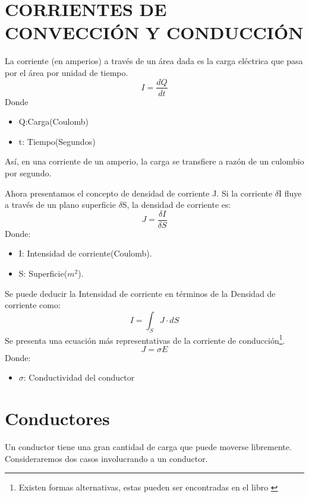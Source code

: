 \documentclass[
	12pt, %
	fleqn, %
	a4paper, %
]{LegrandOrangeBook}
\begin{document}
\section{CORRIENTES DE CONVECCIÓN Y CONDUCCIÓN}
\begin{definition}[Corriente]
La corriente (en amperios) a través de un área dada es la carga eléctrica que pasa por el área por unidad de tiempo.\\
\begin{equation}
\label{eq:corriente}
I=\frac{dQ}{dt}
\end{equation}
Donde\\
\begin{itemize}
\item Q:Carga(Coulomb)
\item t: Tiempo(Segundos)
\end{itemize}
Así, en una corriente de un amperio, la carga se transfiere a razón de un culombio por segundo.
\end{definition}
\begin{definition}
Ahora presentamos el concepto de densidad de corriente J. Si la corriente $\delta$I fluye a través de un plano superficie $\delta$S, la densidad de corriente es:
\begin{equation}
\label{eq: densidad de corriente}
J=\frac{\delta I}{\delta S}
\end{equation}
Donde:
\begin{itemize}
\item I: Intensidad de corriente(Coulomb).
\item S: Superficie($m^2$).
\end{itemize}
\end{definition}
Se puede deducir la Intensidad de corriente en términos de la Densidad de corriente como:
\begin{equation}
\label{eq:intensidad y densidad de corriente}
I=\int_SJ\cdot dS
\end{equation}
Se presenta una ecuación más representativas de la corriente de conducción\footnote{Existen formas alternativas, estas pueden ser encontradas en el libro \cite{sadiku2018elements}}.
\begin{equation}\label{eq:JsigmaE}
J=\sigma E
\end{equation}
Donde:
\begin{itemize}
\item $\sigma$: Conductividad del conductor
\end{itemize}
\section{Conductores}
Un conductor tiene una gran cantidad de carga que puede moverse libremente. Consideraremos dos casos involucrando a un conductor.
\end{document}
